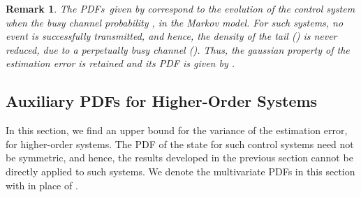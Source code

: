 \documentclass[twocolumn]{autart}
\newtheorem{remark}{Remark}[section]
\begin{document}
\begin{remark}\textbf{}
The PDFs~given by  correspond to the evolution of the control system when the busy channel probability , in the Markov model. For such systems, no event is successfully transmitted, and hence, the density of the tail () is never reduced, due to a perpetually busy channel (). Thus, the gaussian property of the estimation error is retained and its PDF is given by .
\end{remark}

\subsection{Auxiliary PDFs for Higher-Order Systems} \label{SS:PDFmajVector}
In this section, we find an upper bound for the variance of the estimation error, for higher-order systems. The PDF of the state for such control systems need not be symmetric, and hence, the results developed in the previous section cannot be directly applied to such systems. We denote the multivariate PDFs in this section with  in place of .
\end{document}
